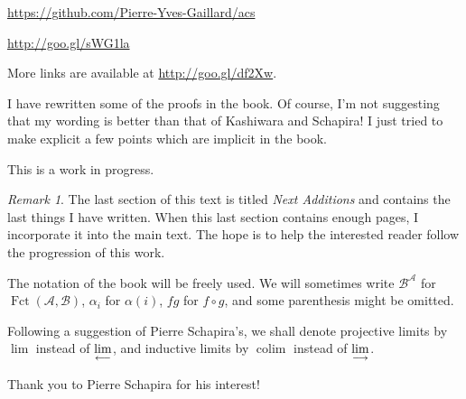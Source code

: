 \documentclass[12pt]{article}
\theoremstyle{remark}
\newtheorem{rk}[thm]{Remark}
\theoremstyle{definition}
\newcommand{\A}{\mathcal A}
\newcommand{\B}{\mathcal B}
\newcommand{\ilim}{\operatornamewithlimits{\underset{\longrightarrow}{lim}}}
\newcommand{\plim}{\operatornamewithlimits{\underset{\longleftarrow}{lim}}}
\DeclareMathOperator*{\coli}{colim}
\DeclareMathOperator{\Fct}{Fct}
\begin{document}
\noindent\href{https://github.com/Pierre-Yves-Gaillard/acs}{https://github.com/Pierre-Yves-Gaillard/acs} 

\noindent\href{http://goo.gl/sWG1la}{http://goo.gl/sWG1la}

More links are available at \href{http://goo.gl/df2Xw}{http://goo.gl/df2Xw}.

I have rewritten some of the proofs in the book. Of course, I'm not suggesting that my wording is better than that of Kashiwara and Schapira! I just tried to make explicit a few points which are implicit in the book. 

This is a work in progress. %
%
\begin{rk}\label{next}
The last section of this text is titled {\em Next Additions} and contains the last things I have written. When this last section contains enough pages, %
I incorporate it into the main text. The hope is to help the interested reader follow the progression of this work.
\end{rk}
%
The notation of the book will be freely used. We will sometimes write $\B^\A$ for $\Fct(\A,\B)$, $\alpha_i$ for $\alpha(i)$, $fg$ for $f\circ g$, and some parenthesis might be omitted. 

Following a suggestion of Pierre Schapira's, we shall denote projective limits by $\lim$ instead of $\plim$, and inductive limits by $\coli$ instead of $\ilim$. 

Thank you to Pierre Schapira for his interest!
%
%
\end{document}
